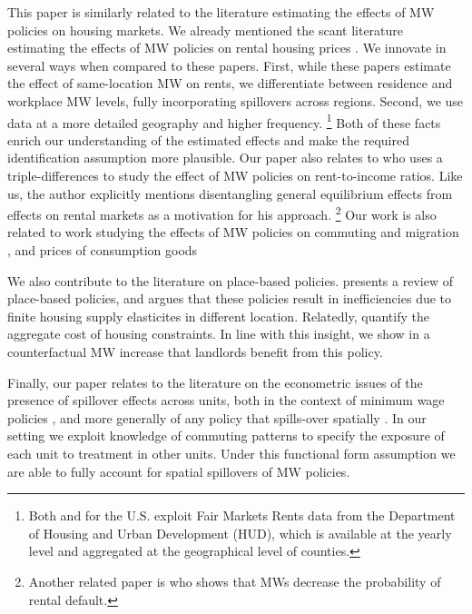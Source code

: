 This paper is similarly related to the literature estimating the effects of MW 
policies on housing markets.
We already mentioned the scant literature estimating the effects of MW policies
on rental housing prices \parencite{Tidemann2018, Yamagishi2021}.
We innovate in several ways when compared to these papers.
First, while these papers estimate the effect of same-location MW on rents, we 
differentiate between residence and workplace MW levels, fully incorporating
spillovers across regions.
Second, we use data at a more detailed geography and higher frequency.%
\footnote{Both \textcite{Tidemann2018} and \textcite{Yamagishi2019} for the U.S. 
exploit Fair Markets Rents data from the Department of Housing and Urban 
Development (HUD), which is available at the yearly level and aggregated at the
geographical level of counties.}
Both of these facts enrich our understanding of the estimated effects and make 
the required identification assumption more plausible.
Our paper also relates to \textcite{Hughes2020} who uses a triple-differences
to study the effect of MW policies on rent-to-income ratios.
Like us, the author explicitly mentions disentangling general equilibrium effects
from effects on rental markets as a motivation for his approach.
\footnote{Another related paper is \textcite{AgarwalEtAl2019} who shows that MWs
decrease the probability of rental default.}
Our work is also related to work studying the effects of MW policies on commuting
and migration \parencite{Cadena2014,Monras2019,PerezPerez2021}, and prices of 
consumption goods \parencite{AllegrettoReich2018,Leung2021}

We also contribute to the literature on place-based policies.
\parencite{KlineMoretti2014} presents a review of place-based policies, and argues
that these policies result in inefficiencies due to finite housing supply elasticites
in different location.
Relatedly, \textcite{HsiehMoretti2019} quantify the aggregate cost of housing constraints.
In line with this insight, we show in a counterfactual MW increase that landlords 
benefit from this policy.



Finally, our paper relates to the literature on the econometric issues of the 
presence of spillover effects across units,
both in the context of minimum wage policies \parencite{Kuehn2016, Huang2020}, and
more generally of any policy that spills-over spatially
\parencite{DelgadoFlorax2015, Butts2021}. 
In our setting we exploit knowledge of commuting patterns to specify the exposure
of each unit to treatment in other units.
Under this functional form assumption we are able to fully account for spatial 
spillovers of MW policies.

